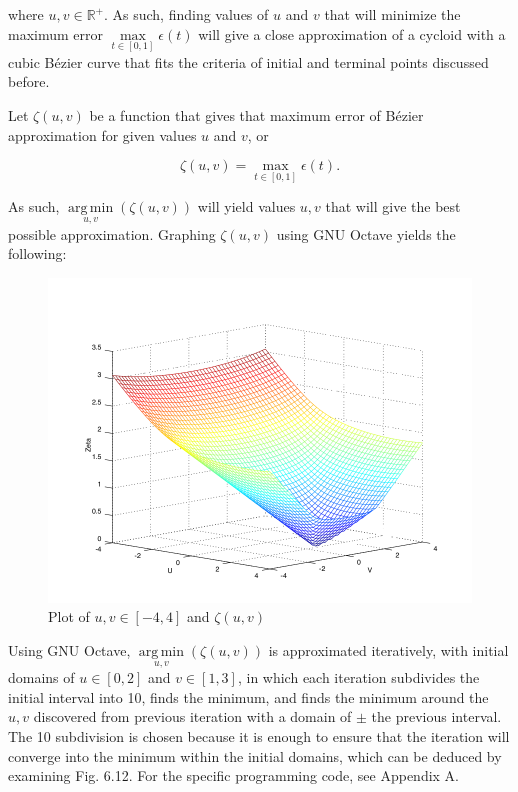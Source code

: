 \documentclass[11pt, oneside, appendixprefix=Appendix]{article}
\DeclareMathOperator*{\argmin}{arg\,min}
\theoremstyle{definition}
\numberwithin{figure}{section}
\begin{document}
where $u, v \in \mathbb{R}^+$. As such, finding values of $u$ and $v$ that will minimize the maximum error $\max\limits_{t \in [0, 1]} \epsilon (t)$ will give a close approximation of a cycloid with a cubic B\'ezier curve that fits the criteria of initial and terminal points discussed before.

Let $\zeta (u, v)$ be a function that gives that maximum error of B\'ezier approximation for given values $u$ and $v$, or

\begin{equation}
\zeta (u, v) = \max\limits_{t \in [0, 1]} \epsilon (t).
\end{equation}

As such, $\argmin\limits_{u, v} (\zeta (u, v))$ will yield values $u, v$ that will give the best possible approximation. Graphing $\zeta (u, v)$ using GNU Octave yields the following:

\begin{figure}[H]
	\centering
	\includegraphics[width=13cm]{numerical_analysis_graph}
	\caption{Plot of $u, v \in [-4, 4]$ and $\zeta (u, v)$}
\end{figure}

Using GNU Octave, $\argmin\limits_{u, v} (\zeta (u, v))$ is approximated iteratively, with initial domains of $u \in [0, 2]$ and $v \in [1, 3]$, in which each iteration subdivides the initial interval into 10, finds the minimum, and finds the minimum around the $u, v$ discovered from previous iteration with a domain of $\pm$ the previous interval. The 10 subdivision is chosen because it is enough to ensure that the iteration will converge into the minimum within the initial domains, which can be deduced by examining Fig. 6.12. For the specific programming code, see Appendix A.
\end{document}
